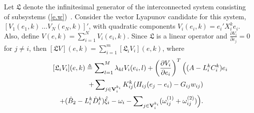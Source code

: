\documentclass[a4paper,twocolumn]{autart}
\begin{document}
Let $\mathfrak{L}$ denote the infinitesimal generator of the interconnected
system consisting of subsystems (\ref{e.w})~\cite{BC-2009}. 
Consider the vector Lyapunov candidate
for this system, $[V_1(e_1,k)~\ldots V_N(e_N,k)]'$,
with quadratic components $V_i(e_i,k)=e_i'X_i^ke_i$. Also, define 
$V(e,k)=\sum_{i=1}^NV_i(e_i,k)$. 
Since $\mathfrak{L}$ is a linear operator and
$\frac{\partial V_i}{\partial e_j}=0$ for $j\neq i$, then
$[\mathfrak{L}V](e,k)=\sum_{i=1}^m[\mathfrak{L}_iV_i](e,k)$,
where 
\begin{eqnarray*}
\lefteqn{[\mathfrak{L}_i V_i](e,k)\triangleq
\sum\nolimits_{l=1}^M\lambda_{kl}V_i(e_i,l)+\left(\frac{\partial V_i}{\partial
    e_i}\right)^T \Big((A-L_i^kC_i^k)e_i} && \\
&& + \sum\nolimits_{j\in
    \mathbf{V}_i^{k_i}} K_{ij}^k(H_{ij}(e_j-e_i)-G_{ij}w_{ij})\\
&&+(\hat B_2-L_i^k\hat D_i^k)\hat \xi_i 
-\omega_i-\sum\nolimits_{j\in
  \mathbf{V}_i^{k_i}}(\omega_{ij}^{(1)}+\omega_{ij}^{(2)})\Big). 
\end{eqnarray*}
\end{document}
